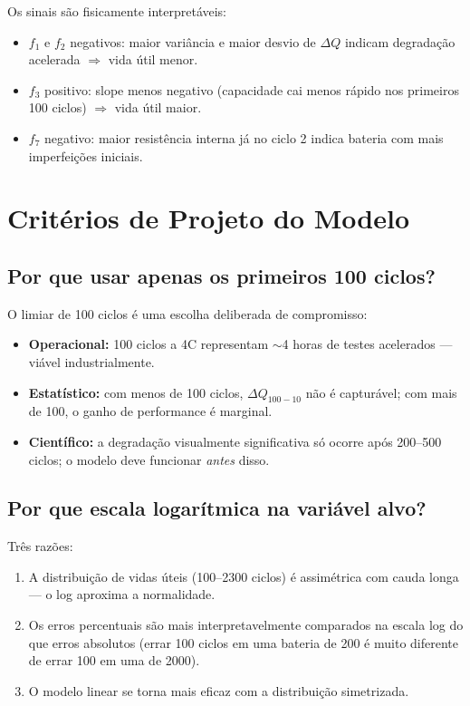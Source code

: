 \documentclass[12pt,a4paper]{article}
\begin{document}
Os sinais s\~ao fisicamente interpret\'{a}veis:
\begin{itemize}
  \item $f_1$ e $f_2$ negativos: maior vari\^{a}ncia e maior desvio de $\Delta Q$
    indicam degrada\c{c}\~ao acelerada $\Rightarrow$ vida \'{u}til menor.
  \item $f_3$ positivo: slope menos negativo (capacidade cai menos r\'{a}pido nos
    primeiros 100 ciclos) $\Rightarrow$ vida \'{u}til maior.
  \item $f_7$ negativo: maior resist\^{e}ncia interna j\'{a} no ciclo 2 indica
    bateria com mais imperfei\c{c}\~oes iniciais.
\end{itemize}

\section{Crit\'{e}rios de Projeto do Modelo}

\subsection{Por que usar apenas os primeiros 100 ciclos?}

O limiar de 100 ciclos \'{e} uma escolha deliberada de compromisso:
\begin{itemize}
  \item \textbf{Operacional:} 100 ciclos a 4C representam $\sim$4 horas de
    testes acelerados --- vi\'{a}vel industrialmente.
  \item \textbf{Estat\'{i}stico:} com menos de 100 ciclos, $\Delta Q_{100-10}$
    n\~ao \'{e} captur\'{a}vel; com mais de 100, o ganho de performance \'{e} marginal.
  \item \textbf{Cient\'{i}fico:} a degrada\c{c}\~ao visualmente significativa s\'{o}
    ocorre ap\'{o}s 200--500 ciclos; o modelo deve funcionar \textit{antes} disso.
\end{itemize}

\subsection{Por que escala logar\'{i}tmica na vari\'{a}vel alvo?}

Tr\^{e}s raz\~oes:
\begin{enumerate}
  \item A distribui\c{c}\~ao de vidas \'{u}teis (100--2300 ciclos) \'{e} assim\'{e}trica
    com cauda longa --- o log aproxima a normalidade.
  \item Os erros percentuais s\~ao mais interpretavelmente comparados na escala log
    do que erros absolutos (errar 100 ciclos em uma bateria de 200 \'{e} muito
    diferente de errar 100 em uma de 2000).
  \item O modelo linear se torna mais eficaz com a distribui\c{c}\~ao simetrizada.
\end{enumerate}
\end{document}
